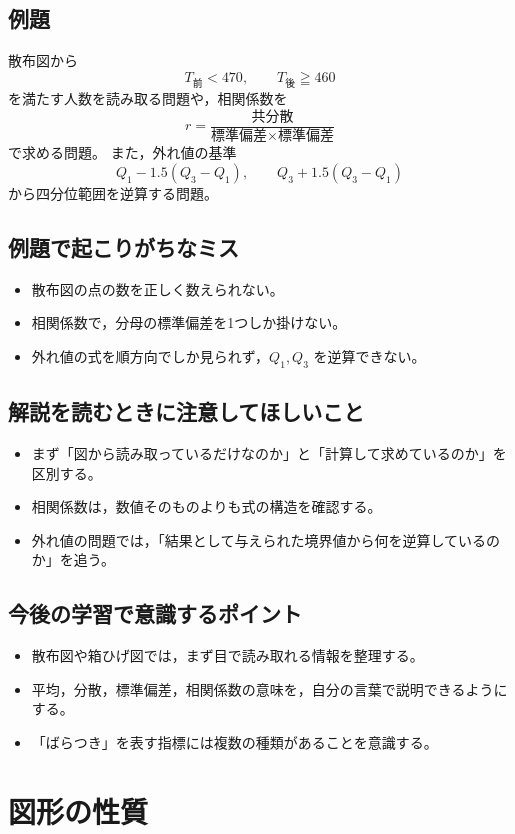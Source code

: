 \subsection*{例題}
散布図から
\[
T_{\text{前}}<470,\qquad T_{\text{後}}\geqq 460
\]
を満たす人数を読み取る問題や，相関係数を
\[
r=\frac{\text{共分散}}{\text{標準偏差}\times \text{標準偏差}}
\]
で求める問題。  
また，外れ値の基準
\[
Q_1-1.5(Q_3-Q_1),\qquad Q_3+1.5(Q_3-Q_1)
\]
から四分位範囲を逆算する問題。

\subsection*{例題で起こりがちなミス}
\begin{itemize}
  \item 散布図の点の数を正しく数えられない。
  \item 相関係数で，分母の標準偏差を1つしか掛けない。
  \item 外れ値の式を順方向でしか見られず，$Q_1,Q_3$ を逆算できない。
\end{itemize}

\subsection*{解説を読むときに注意してほしいこと}
\begin{itemize}
  \item まず「図から読み取っているだけなのか」と「計算して求めているのか」を区別する。
  \item 相関係数は，数値そのものよりも式の構造を確認する。
  \item 外れ値の問題では，「結果として与えられた境界値から何を逆算しているのか」を追う。
\end{itemize}

\subsection*{今後の学習で意識するポイント}
\begin{itemize}
  \item 散布図や箱ひげ図では，まず目で読み取れる情報を整理する。
  \item 平均，分散，標準偏差，相関係数の意味を，自分の言葉で説明できるようにする。
  \item 「ばらつき」を表す指標には複数の種類があることを意識する。
\end{itemize}

\bigskip

\section*{図形の性質}


